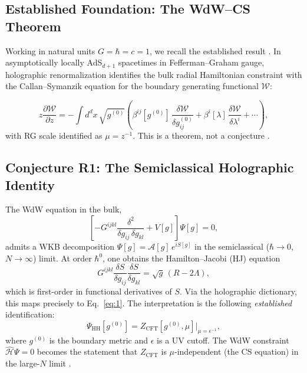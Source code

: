 \documentclass[11pt,a4paper]{article}
\begin{document}
\subsection{Established Foundation: The WdW--CS Theorem}

Working in natural units $G = \hbar = c = 1$, we recall the established result \cite{skenderis2002}. In asymptotically locally AdS$_{d+1}$ spacetimes in Fefferman--Graham gauge, holographic renormalization identifies the bulk radial Hamiltonian constraint with the Callan--Symanzik equation for the boundary generating functional $\mathcal{W}$:

\begin{equation}
  z\frac{\partial \mathcal{W}}{\partial z}
  = -\int d^d x\,\sqrt{g^{(0)}}
    \left(
      \beta^{ij}[g^{(0)}]\,\frac{\delta \mathcal{W}}{\delta g^{(0)}_{ij}}
      + \beta^{i}[\lambda]\,\frac{\delta \mathcal{W}}{\delta \lambda^{i}}
      + \cdots
    \right),
  \label{eq:1}
\end{equation}
with RG scale identified as $\mu = z^{-1}$. This is a theorem, not a conjecture \cite{skenderis2002,witten1998}.

\subsection{Conjecture R1: The Semiclassical Holographic Identity}

The WdW equation in the bulk,
\begin{equation}
  \left[
    -G^{ijkl}\frac{\delta^2}{\delta g_{ij}\,\delta g_{kl}} + V[g]
  \right]\Psi[g] = 0,
  \label{eq:2}
\end{equation}
admits a WKB decomposition $\Psi[g] = \mathcal{A}[g]\,e^{iS[g]}$ in the semiclassical ($\hbar \to 0$, $N \to \infty$) limit. At order $\hbar^0$, one obtains the Hamilton--Jacobi (HJ) equation
\begin{equation}
  G^{ijkl}\frac{\delta S}{\delta g_{ij}}\frac{\delta S}{\delta g_{kl}}
  = \sqrt{g}\,(R - 2\Lambda),
  \label{eq:3}
\end{equation}
which is first-order in functional derivatives of $S$. Via the holographic dictionary, this maps precisely to Eq.~\eqref{eq:1}. The interpretation is the following \emph{established} identification:
\begin{equation}
  \Psi_{\mathrm{HH}}[g^{(0)}]
  = Z_{\mathrm{CFT}}[g^{(0)},\mu]\Big|_{\mu = \epsilon^{-1}},
  \label{eq:4}
\end{equation}
where $g^{(0)}$ is the boundary metric and $\epsilon$ is a UV cutoff. The WdW constraint $\hat{\mathcal{H}}\Psi = 0$ becomes the statement that $Z_{\mathrm{CFT}}$ is $\mu$-independent (the CS equation) in the large-$N$ limit \cite{maldacena1997,witten1998}.
\end{document}
